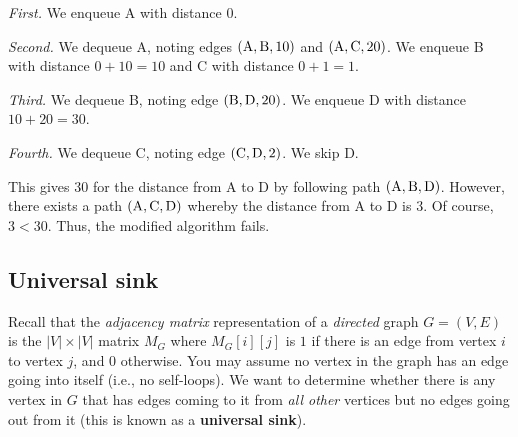 \begin{enumerate}
\begin{solution}
\textit{First. }We enqueue A with distance $0$.

\textit{Second. }We dequeue A, noting edges $({\rm A},{\rm B},10)$ and $({\rm A},{\rm C},20)$. We enqueue B with distance $0+10=10$ and C with distance $0+1=1$.

\textit{Third. }We dequeue B, noting edge $({\rm B},{\rm D},20)$. We enqueue D with distance $10+20=30$.

\textit{Fourth. }We dequeue C, noting edge $({\rm C},{\rm D},2)$. We skip D.

This gives $30$ for the distance from A to D by following path $({\rm A},{\rm B},{\rm D})$. However, there exists a path $({\rm A},{\rm C},{\rm D})$ whereby the distance from A to D is $3$. Of course, $3<30$. Thus, the modified algorithm fails.
\end{solution}
\end{enumerate}
\newpage
\subsection{Universal sink}
Recall that the \emph{adjacency matrix} representation of a \emph{directed} graph $G=(V,E)$ is the $|V| \times |V|$ matrix $M_G$ where $M_G[i][j]$ is $1$ if there is an edge from vertex $i$ to vertex $j$, and $0$ otherwise.
You may assume no vertex in the graph has an edge going into itself (i.e., no self-loops). We want to determine whether there is any vertex in $G$ that has edges coming to it from \emph{all other} vertices but no edges going out from it (this is known as a \textbf{universal sink}). 

